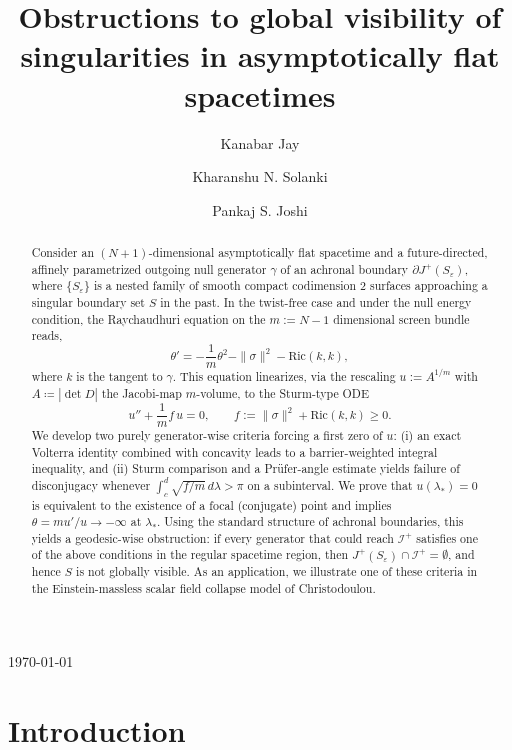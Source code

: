\documentclass[a4paper, reqno]{amsart}
\title[Obstructions to global visibility of singularities]{Obstructions to global visibility of singularities in asymptotically flat spacetimes}
\author{Kanabar Jay}
\author{Kharanshu N. Solanki}
\author{Pankaj S. Joshi}
\numberwithin{equation}{section}
\theoremstyle{plain}
\theoremstyle{definition}
\theoremstyle{remark}
\newcommand{\printtitledate}[1]{%
  \vspace*{-0.6\baselineskip}%
  \begin{center}\normalfont\small #1\end{center}%
  \vspace*{-0.3\baselineskip}%
}
\begin{document}
\maketitle
\printtitledate{\today}
\begin{abstract}
Consider an $(N+1)$-dimensional asymptotically flat spacetime and a future-directed, affinely parametrized outgoing null generator $\gamma$ of an achronal boundary $\partial J^+(S_\varepsilon)$, where $\{S_\varepsilon\}$ is a nested family of smooth compact codimension $2$ surfaces approaching a singular boundary set \(S\) in the past. In the twist-free case and under the null energy condition, the Raychaudhuri equation on the $m:=N-1$ dimensional screen bundle reads,
$$
\theta'=-\frac1m\theta^2-\|\sigma\|^2-\mathrm{Ric}(k,k),
$$
where $k$ is the tangent to $\gamma$. This equation linearizes, via the rescaling $u:=A^{1/m}$ with $A \coloneqq|\det D|$ the Jacobi-map \(m\)-volume, to the Sturm-type ODE
$$
u''+\frac1m f\,u=0,\qquad f:=\|\sigma\|^2+\mathrm{Ric}(k,k)\ge 0.
$$
We develop two purely generator-wise criteria forcing a first zero of $u$: (i) an exact Volterra identity combined with concavity leads to a barrier-weighted integral inequality, and (ii) Sturm comparison and a Prüfer-angle estimate yields failure of disconjugacy whenever $\int_c^d \sqrt{f/m}\,d\lambda>\pi$ on a subinterval. We prove that $u(\lambda_\ast)=0$ is equivalent to the existence of a focal (conjugate) point and implies $\theta= m u'/u\to-\infty$ at $\lambda_\ast$. Using the standard structure of achronal boundaries, this yields a geodesic-wise obstruction: if every generator that could reach $\mathscr I^+$ satisfies one of the above conditions in the regular spacetime region, then $J^+(S_\varepsilon)\cap \mathscr I^+=\emptyset$, and hence \(S\) is not globally visible. As an application, we illustrate one of these criteria in the Einstein-massless scalar field collapse model of Christodoulou.
\end{abstract}
\setcounter{tocdepth}{2}


\setcounter{tocdepth}{1}
\tableofcontents

\section{Introduction}
\end{document}
